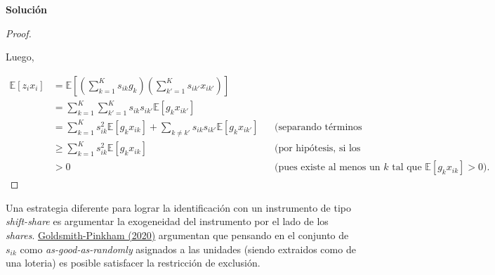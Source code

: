 \documentclass[a4paper, answers, addpoints, 11pt]{exam}
\newenvironment{solucion}{%
  \begin{mdframed}[
    backgroundcolor=blue!5,    %
    linecolor=blue!50,          %
    linewidth=2pt,              %
    leftmargin=10pt,            %
    rightmargin=8pt,           %
    topline=true,              %
    bottomline=true,            %
    roundcorner=10pt,           %
    innerleftmargin=10pt,       %
    innerrightmargin=10pt,      %
    innerbottommargin=10pt,     %
    innertopmargin=10pt         %
  ]%
  \begin{tcolorbox}[colframe=blue!50!black, colback=blue!50, coltitle=white, sharp corners=all, boxrule=1mm, width=\textwidth, halign=left, valign=center, top=0mm, bottom=0mm, left=0mm, right=0mm] \textbf{Solución} \end{tcolorbox} }{\end{mdframed}}
\begin{document}
\begin{enumerate}
\begin{solucion}
\begin{proof}
\begin{itemize}
\end{itemize}


Luego,

\begin{align*}
\mathbb{E}[z_i x_i] 
&= \mathbb{E} \left[ \left( \sum_{k=1}^K s_{ik} g_k \right) \left( \sum_{k'=1}^K s_{ik'} x_{ik'} \right) \right] \\
&= \sum_{k=1}^K \sum_{k'=1}^K s_{ik} s_{ik'} \mathbb{E}[g_k x_{ik'}] \\
&= \sum_{k=1}^K s_{ik}^2 \mathbb{E}[g_k x_{ik}] + \sum_{k \neq k'} s_{ik} s_{ik'} \mathbb{E}[g_k x_{ik'}] && \text{(separando términos diagonales y cruzados)} \\
&\geq \sum_{k=1}^K s_{ik}^2 \mathbb{E}[g_k x_{ik}] && \text{(por hipótesis, si los cruzados son nulos o pequeños)} \\
&> 0 && \text{(pues existe al menos un } k \text{ tal que } \mathbb{E}[g_k x_{ik}] > 0).
\end{align*}


    \end{proof}
    
    \end{solucion}
    
\end{enumerate}
    
Una estrategia diferente para lograr la identificación con un instrumento de tipo \textit{shift-share} es argumentar la exogeneidad del instrumento por el lado de los \textit{shares}. \href{https://paulgp.com/papers/bartik_gpss.pdf}{Goldsmith-Pinkham (2020)} argumentan que pensando en el conjunto de $s_{ik}$ como \textit{as-good-as-randomly} asignados a las unidades (siendo extraidos como de una loteria) es posible satisfacer la restricción de exclusión. 
\end{document}
